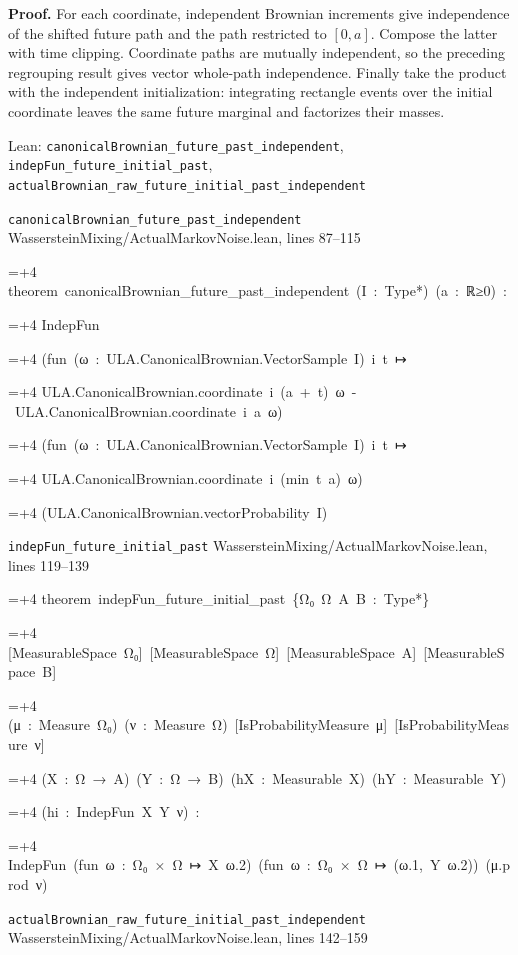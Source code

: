 \documentclass[11pt,a4paper]{article}
\newlength{\leancharwidth}
\newenvironment{leancode}{\par\smallskip\begingroup\ttfamily\footnotesize\raggedright
  \settowidth{\leancharwidth}{M}\setlength{\parskip}{0pt}\setlength{\parindent}{0pt}
  \frenchspacing}{\par\endgroup\smallskip}
\newcommand{\leanline}[2]{\hangindent=\dimexpr#1\leancharwidth+4\leancharwidth\relax
  \hangafter=1\noindent\hspace*{#1\leancharwidth}#2\par}
\newcommand{\leansource}[1]{\par{\footnotesize\color{leanmuted}#1}\par}
\begin{document}
\textbf{Proof.} For each coordinate, independent Brownian increments give independence of the shifted future path and the path restricted to \([0,a]\). Compose the latter with time clipping. Coordinate paths are mutually independent, so the preceding regrouping result gives vector whole-path independence. Finally take the product with the independent initialization: integrating rectangle events over the initial coordinate leaves the same future marginal and factorizes their masses.

\begin{leanbox}{Lean: \texttt{canonicalBrownian\_\allowbreak{}future\_\allowbreak{}past\_\allowbreak{}independent}, \texttt{indepFun\_\allowbreak{}future\_\allowbreak{}initial\_\allowbreak{}past}, \texttt{actualBrownian\_\allowbreak{}raw\_\allowbreak{}future\_\allowbreak{}initial\_\allowbreak{}past\_\allowbreak{}independent}}
\leansource{\texttt{canonicalBrownian\_\allowbreak{}future\_\allowbreak{}past\_\allowbreak{}independent} \quad WassersteinMixing/\allowbreak{}ActualMarkovNoise.lean, lines 87–115}
\begin{leancode}
\leanline{0}{theorem\ canonicalBrownian\_future\_past\_independent\ (I\ :\ Type*)\ (a\ :\ ℝ≥0)\ :}
\leanline{4}{IndepFun}
\leanline{6}{(fun\ (ω\ :\ ULA.CanonicalBrownian.VectorSample\ I)\ i\ t\ ↦}
\leanline{8}{ULA.CanonicalBrownian.coordinate\ i\ (a\ +\ t)\ ω\ -\ ULA.CanonicalBrownian.coordinate\ i\ a\ ω)}
\leanline{6}{(fun\ (ω\ :\ ULA.CanonicalBrownian.VectorSample\ I)\ i\ t\ ↦}
\leanline{8}{ULA.CanonicalBrownian.coordinate\ i\ (min\ t\ a)\ ω)}
\leanline{6}{(ULA.CanonicalBrownian.vectorProbability\ I)}
\end{leancode}
\leansource{\texttt{indepFun\_\allowbreak{}future\_\allowbreak{}initial\_\allowbreak{}past} \quad WassersteinMixing/\allowbreak{}ActualMarkovNoise.lean, lines 119–139}
\begin{leancode}
\leanline{0}{theorem\ indepFun\_future\_initial\_past\ \{Ω₀\ Ω\ A\ B\ :\ Type*\}}
\leanline{4}{[MeasurableSpace\ Ω₀]\ [MeasurableSpace\ Ω]\ [MeasurableSpace\ A]\ [MeasurableSpace\ B]}
\leanline{4}{(μ\ :\ Measure\ Ω₀)\ (ν\ :\ Measure\ Ω)\ [IsProbabilityMeasure\ μ]\ [IsProbabilityMeasure\ ν]}
\leanline{4}{(X\ :\ Ω\ →\ A)\ (Y\ :\ Ω\ →\ B)\ (hX\ :\ Measurable\ X)\ (hY\ :\ Measurable\ Y)}
\leanline{4}{(hi\ :\ IndepFun\ X\ Y\ ν)\ :}
\leanline{4}{IndepFun\ (fun\ ω\ :\ Ω₀\ ×\ Ω\ ↦\ X\ ω.2)\ (fun\ ω\ :\ Ω₀\ ×\ Ω\ ↦\ (ω.1,\ Y\ ω.2))\ (μ.prod\ ν)}
\end{leancode}
\leansource{\texttt{actualBrownian\_\allowbreak{}raw\_\allowbreak{}future\_\allowbreak{}initial\_\allowbreak{}past\_\allowbreak{}independent} \quad WassersteinMixing/\allowbreak{}ActualMarkovNoise.lean, lines 142–159}

\end{leanbox}
\end{document}
